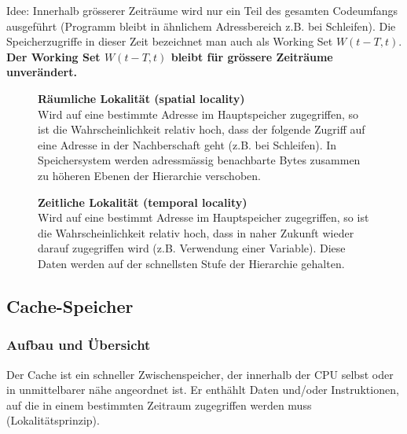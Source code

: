 Idee: Innerhalb grösserer Zeiträume wird nur ein Teil des gesamten Codeumfangs ausgeführt (Programm bleibt in ähnlichem Adressbereich z.B. bei Schleifen).
Die Speicherzugriffe in dieser Zeit bezeichnet man auch als Working Set $W(t-T,t)$.
\textbf{Der Working Set $W(t-T,t)$ bleibt für grössere Zeiträume unverändert.}

\begin{figure}[ht]
	\begin{minipage}[t]{0.475\textwidth}
		\textbf{Räumliche Lokalität (spatial locality)}\\
		Wird auf eine bestimmte Adresse im Hauptspeicher zugegriffen, so ist die Wahrscheinlichkeit relativ hoch, dass der folgende Zugriff auf eine Adresse in der Nachberschaft geht (z.B. bei Schleifen).
		In Speichersystem werden adressmässig benachbarte Bytes zusammen zu höheren Ebenen der Hierarchie verschoben.
	\end{minipage}
	\hfill
	\begin{minipage}[t]{0.475\textwidth}
		\textbf{Zeitliche Lokalität (temporal locality)}\\
		Wird auf eine bestimmt Adresse im Hauptspeicher zugegriffen, so ist die Wahrscheinlichkeit relativ hoch, dass in naher Zukunft wieder darauf zugegriffen wird (z.B. Verwendung einer Variable).
		Diese Daten werden auf der schnellsten Stufe der Hierarchie gehalten.
	\end{minipage}	
\end{figure}

\subsection{Cache-Speicher}

\subsubsection{Aufbau und Übersicht}
Der Cache ist ein schneller Zwischenspeicher, der innerhalb der CPU selbst oder in unmittelbarer nähe angeordnet ist.
Er enthählt Daten und/oder Instruktionen, auf die in einem bestimmten Zeitraum zugegriffen werden muss (Lokalitätsprinzip).

